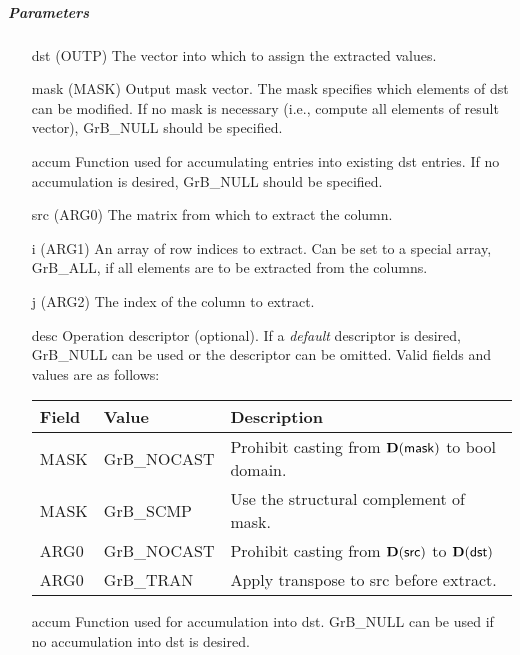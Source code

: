 \subparagraph{Parameters}

\begin{itemize}[leftmargin=1in]
    \item[{\sf dst}]   ({\sf OUTP}) The vector into which to assign the extracted values.

    \item[{\sf mask}] ({\sf MASK}) Output mask vector. The mask
    specifies which elements of {\sf dst} can be modified.
    If no mask is necessary (i.e., compute all elements of result
    vector), {\sf GrB\_NULL} should be specified.

    \item[{\sf accum}]  Function used for accumulating entries into existing {\sf dst} entries. 
			If no accumulation is desired, {\sf GrB\_NULL} should be specified.

    \item[{\sf src}]   ({\sf ARG0}) The matrix from which to extract the column.

    \item[{\sf i}]     ({\sf ARG1}) An array of row indices to extract. Can
                              be set to a special array, {\sf GrB\_ALL}, if all elements
                              are to be extracted from the columns.
    \item[{\sf j}]     ({\sf ARG2}) The index of the column to extract.

    \item[{\sf desc}]   Operation descriptor (optional). If a
    \emph{default} descriptor is desired, {\sf GrB\_NULL} can be
    used or the descriptor can be omitted.  Valid fields and values are as follows: \\
    \begin{tabular}{lll}
    Field  & Value & Description \\
    \hline
    {\sf MASK} & {\sf GrB\_NOCAST} & Prohibit casting from $\bold{D}({\sf mask})$ to {\sf bool} domain. \\
    {\sf MASK} & {\sf GrB\_SCMP} & Use the structural complement of {\sf mask}. \\
    {\sf ARG0} & {\sf GrB\_NOCAST} & Prohibit casting from $\bold{D}({\sf src})$ to $\bold{D}({\sf dst})$ \\
    {\sf ARG0} & {\sf GrB\_TRAN} & Apply transpose to {\sf src} before extract. \\
    \end{tabular}

    \item[{\sf accum}] Function used for accumulation into dst.  {\sf GrB\_NULL}
                       can be used if no accumulation into dst is desired.
\end{itemize}

